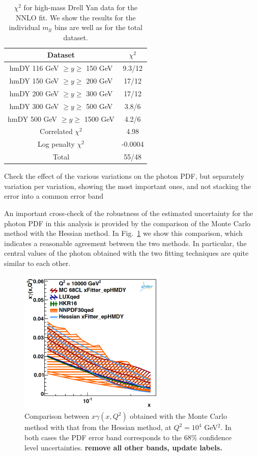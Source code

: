 \begin{table}[h]
  \centering
  \begin{tabular}{|c|c|}
    \hline
    Dataset  &   $\chi^2$ \\
    \hline
    \hline
    hmDY  116 GeV $\ge y\ge $ 150 GeV  &  9.3/12 \\
    hmDY  150 GeV $\ge y\ge $ 200 GeV  &  17/12 \\
    hmDY  200 GeV $\ge y\ge $ 300 GeV  &  17/12 \\
    hmDY  300 GeV $\ge y\ge $ 500 GeV  &  3.8/6 \\
    hmDY  500 GeV $\ge y\ge $ 1500 GeV  &  4.2/6 \\
    \hline
    Correlated $\chi^2$ & 4.98 \\
    Log penalty $\chi^2$  & -0.0004 \\
    \hline
    \hline
    Total  & 55/48 \\
    \hline
    \end{tabular}
  \caption{$\chi^{2}$ for high-mass Drell Yan data for the NNLO fit.
    We show the results for the individual $m_{ll}$ bins
    are well as for the total dataset.
\label{tab:chi2fit}
  }
\end{table}


Check the effect of the various variations on the photon PDF, but separately variation per variation,
showing the most important ones, and not stacking the error into a common error band


An important cross-check of the robustness of the estimated uncertainty for the photon
PDF in this analysis is provided by the comparison of the Monte Carlo method
with the Hessian method.
%
In Fig.~\ref{fig:photon_mc_vs_hessian} we show this comparison,
which indicates a reasonable agreement between the two methods.
%
In particular, the central values of the photon obtained with the two fitting
techniques are quite similar to each other.

\begin{figure}[h]
\centering
\includegraphics[width=7cm]{figs/photon_mc_vs_hessian} 
\caption{Comparison between $x\gamma(x,Q^2)$ obtained with the
  Monte Carlo method with that from the Hessian method,
  at $Q^2=10^4$ GeV$^2$.
  In both cases the PDF error band corresponds to the 68\% confidence level
  uncertainties. {\bf remove all other bands, update labels.}
}
\label{fig:photon_mc_vs_hessian}
\end{figure}


